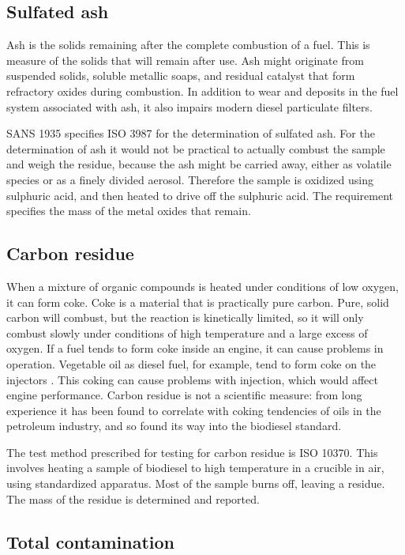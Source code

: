 \subsection{Sulfated ash}

Ash is the solids remaining after the complete combustion of a fuel. This is
measure of the solids that will remain after use. Ash might originate from
suspended solids, soluble metallic soaps, and residual catalyst that form
refractory oxides during combustion. In addition to wear and deposits in the
fuel system associated with ash, it also impairs modern diesel particulate
filters.

SANS 1935 specifies ISO 3987 for the determination of sulfated ash. For the
determination of ash it would not be practical to actually combust the sample
and weigh the residue, because the ash might be carried away, either as volatile
species or as a finely divided aerosol. Therefore the sample is oxidized using
sulphuric acid, and then heated to drive off the sulphuric acid. The requirement
specifies the mass of the metal oxides that remain.

\subsection{Carbon residue}

When a mixture of organic compounds is heated under conditions of low oxygen, it
can form coke. Coke is a material that is practically pure carbon. Pure, solid
carbon will combust, but the reaction is kinetically limited, so it will only
combust slowly under conditions of high temperature and a large excess of
oxygen. If a fuel tends to form coke inside an engine, it can cause problems in
operation. Vegetable oil as diesel fuel, for example, tend to form coke on the
injectors \autocite{vanderWalt1982}. This coking can cause problems with injection,
which would affect engine performance. Carbon residue is not a scientific
measure: from long experience it has been found to correlate with coking
tendencies of oils in the petroleum industry, and so found its way into the
biodiesel standard.

The test method prescribed for testing for carbon residue is ISO 10370. This
involves heating a sample of biodiesel to high temperature in a crucible in air,
using standardized apparatus. Most of the sample burns off, leaving a residue.
The mass of the residue is determined and reported.

\subsection{Total contamination}

